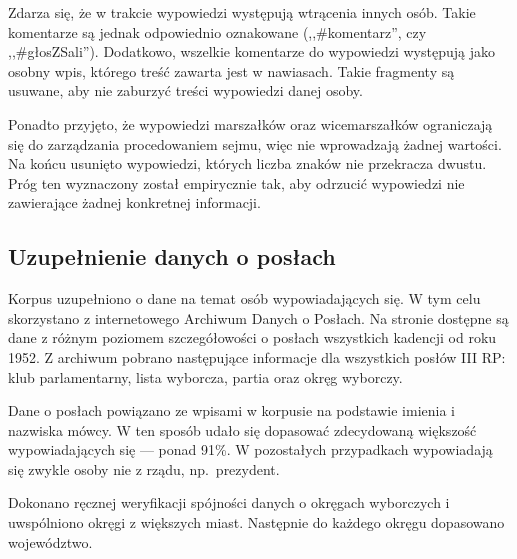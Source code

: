     Zdarza się, że w trakcie wypowiedzi występują wtrącenia innych osób.
    Takie komentarze są jednak odpowiednio oznakowane (,,\#komentarz'', czy ,,\#głosZSali'').
    Dodatkowo, wszelkie komentarze do wypowiedzi występują jako osobny wpis, którego treść zawarta jest w nawiasach.
    Takie fragmenty są usuwane, aby nie zaburzyć treści wypowiedzi danej osoby.

    Ponadto przyjęto, że wypowiedzi marszałków oraz wicemarszałków ograniczają się do zarządzania procedowaniem sejmu,
      więc nie wprowadzają żadnej wartości.
    Na końcu usunięto wypowiedzi, których liczba znaków nie przekracza dwustu.
    Próg ten wyznaczony został empirycznie tak, aby odrzucić wypowiedzi nie zawierające żadnej konkretnej informacji.

  \subsection{Uzupełnienie danych o posłach}
    Korpus uzupełniono o dane na temat osób wypowiadających się.
    W tym celu skorzystano z internetowego Archiwum Danych o Posłach\cite{archiwum_posl}.
    Na stronie dostępne są dane z różnym poziomem szczegółowości o posłach wszystkich kadencji od roku 1952.
    Z archiwum pobrano następujące informacje dla wszystkich posłów III RP: klub parlamentarny, lista wyborcza, partia oraz okręg wyborczy.

    Dane o posłach powiązano ze wpisami w korpusie na podstawie imienia i nazwiska mówcy.
    W ten sposób udało się dopasować zdecydowaną większość wypowiadających się --- ponad 91\%.
    W pozostałych przypadkach wypowiadają się zwykle osoby nie z rządu, np.\ prezydent.

    Dokonano ręcznej weryfikacji spójności danych o okręgach wyborczych i uwspólniono okręgi z większych miast.
    Następnie do każdego okręgu dopasowano województwo.

